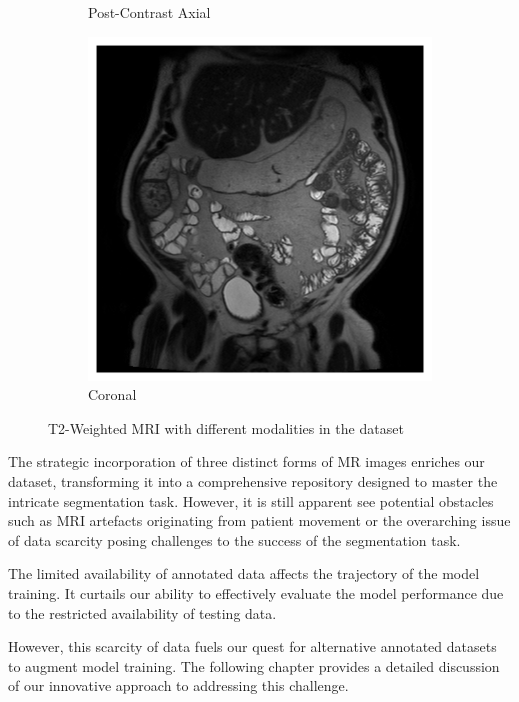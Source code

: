 \begin{figure}[htp]
\begin{subfigure}[b]{0.32\textwidth}
        \caption{Post-Contrast Axial}
        \label{fig:axial-postcon}
    \end{subfigure}
    \hfill
    \begin{subfigure}[b]{0.32\textwidth}
        \centering
        \includegraphics[width=\textwidth]{./figures/coronal.png}
        \caption{Coronal}
        \label{fig:coronal}
    \end{subfigure}
    \caption{T2-Weighted MRI with different modalities in the dataset}
    \label{fig:mri}
\end{figure}

The strategic incorporation of three distinct forms of MR images enriches our dataset, transforming it into a comprehensive repository designed to master the intricate segmentation task. However, it is still apparent see potential obstacles such as MRI artefacts originating from patient movement or the overarching issue of data scarcity posing challenges to the success of the segmentation task.

The limited availability of annotated data affects the trajectory of the model training. It curtails our ability to effectively evaluate the model performance due to the restricted availability of testing data.

However, this scarcity of data fuels our quest for alternative annotated datasets to augment model training. The following chapter provides a detailed discussion of our innovative approach to addressing this challenge.

